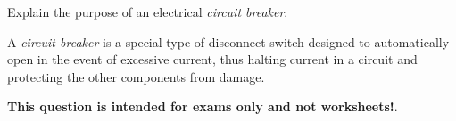 

Explain the purpose of an electrical {\it circuit breaker}.







A {\it circuit breaker} is a special type of disconnect switch designed to automatically open in the event of excessive current, thus halting current in a circuit and protecting the other components from damage.







{\bf This question is intended for exams only and not worksheets!}.



